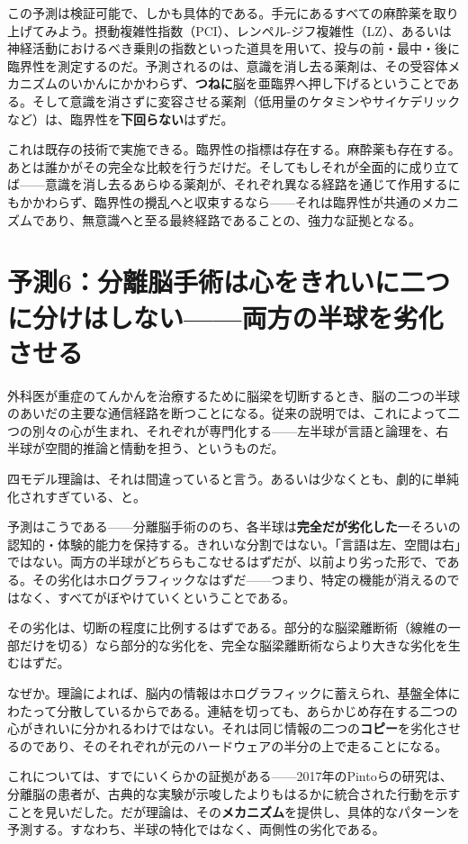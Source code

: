 \documentclass[11pt, twoside, openright]{book}
\begin{document}
この予測は検証可能で、しかも具体的である。手元にあるすべての麻酔薬を取り上げてみよう。摂動複雑性指数（PCI）、レンペル-ジフ複雑性（LZ）、あるいは神経活動におけるべき乗則の指数といった道具を用いて、投与の前・最中・後に臨界性を測定するのだ。予測されるのは、意識を消し去る薬剤は、その受容体メカニズムのいかんにかかわらず、\textbf{つねに}脳を亜臨界へ押し下げるということである。そして意識を消さずに変容させる薬剤（低用量のケタミンやサイケデリックなど）は、臨界性を\textbf{下回らない}はずだ。

これは既存の技術で実施できる。臨界性の指標は存在する。麻酔薬も存在する。あとは誰かがその完全な比較を行うだけだ。そしてもしそれが全面的に成り立てば------意識を消し去るあらゆる薬剤が、それぞれ異なる経路を通じて作用するにもかかわらず、臨界性の攪乱へと収束するなら------それは臨界性が共通のメカニズムであり、無意識へと至る最終経路であることの、強力な証拠となる。

\section*{予測6：分離脳手術は心をきれいに二つに分けはしない------両方の半球を劣化させる}

外科医が重症のてんかんを治療するために脳梁を切断するとき、脳の二つの半球のあいだの主要な通信経路を断つことになる。従来の説明では、これによって二つの別々の心が生まれ、それぞれが専門化する------左半球が言語と論理を、右半球が空間的推論と情動を担う、というものだ。

四モデル理論は、それは間違っていると言う。あるいは少なくとも、劇的に単純化されすぎている、と。

予測はこうである------分離脳手術ののち、各半球は\textbf{完全だが劣化した}一そろいの認知的・体験的能力を保持する。きれいな分割ではない。「言語は左、空間は右」ではない。両方の半球がどちらもこなせるはずだが、以前より劣った形で、である。その劣化はホログラフィックなはずだ------つまり、特定の機能が消えるのではなく、すべてがぼやけていくということである。

その劣化は、切断の程度に比例するはずである。部分的な脳梁離断術（線維の一部だけを切る）なら部分的な劣化を、完全な脳梁離断術ならより大きな劣化を生むはずだ。

なぜか。理論によれば、脳内の情報はホログラフィックに蓄えられ、基盤全体にわたって分散しているからである。連結を切っても、あらかじめ存在する二つの心がきれいに分かれるわけではない。それは同じ情報の二つの\textbf{コピー}を劣化させるのであり、そのそれぞれが元のハードウェアの半分の上で走ることになる。

これについては、すでにいくらかの証拠がある------2017年のPintoらの研究は、分離脳の患者が、古典的な実験が示唆したよりもはるかに統合された行動を示すことを見いだした。だが理論は、その\textbf{メカニズム}を提供し、具体的なパターンを予測する。すなわち、半球の特化ではなく、両側性の劣化である。
\end{document}
